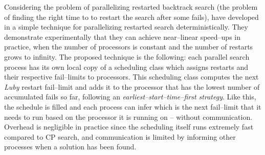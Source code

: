 Considering the problem of parallelizing restarted backtrack search (the problem of finding the right time to to restart the search after some fails),  have developed in \cite{Cire2011} a simple technique for parallelizing restarted search deterministically. They demonstrate experimentally that they can achieve near--linear speed--ups in practice, when the number of processors is constant and the number of restarts grows to infinity. The proposed technique is the following: each parallel search process has its own local copy of a scheduling class which assigns restarts and their respective fail--limits to processors. This scheduling class computes the next {\it Luby} restart fail--limit and adds it to the processor that has the lowest number of accumulated fails so far, following an {\it earliest--start--time--first strategy}. Like this, the schedule is filled and each process can infer which is the next fail--limit that it needs to run based on the processor it is running on -- without communication. Overhead is negligible in practice since the scheduling itself runs extremely fast compared to CP search, and communication is limited by informing other processes when a solution has been found.